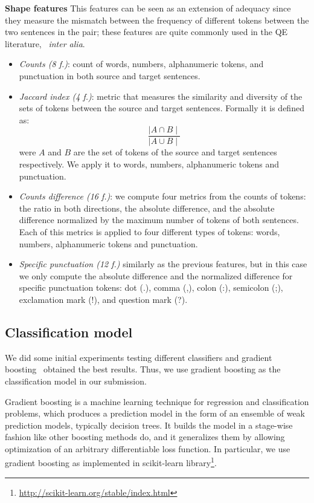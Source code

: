 \textbf{Shape features} This features can be seen as an extension of adequacy since they measure the mismatch between the frequency of different tokens between the two sentences in the pair; these features are quite commonly used in the QE literature,~\cite{specia15} \textit{inter alia}.
\begin{itemize}
\item \textit{Counts (8 f.)}: count of words, numbers, alphanumeric tokens, and punctuation in both source and target sentences.
\item \textit{Jaccard index (4 f.)}: metric that measures the similarity and diversity of the sets of tokens between the source and target sentences. Formally it is defined as:
$$ \frac{\mid A\cap B\mid}{\mid A\cup B\mid}$$
were $A$ and $B$ are the set of tokens of the source and target sentences respectively. We apply it to words, numbers, alphanumeric tokens and punctuation.
\item \textit{Counts difference (16 f.)}: we compute four metrics from the counts of tokens: the ratio in both directions, the absolute difference, and the absolute difference normalized by the maximum number of tokens of both sentences. Each of this metrics is applied to four different types of tokens: words, numbers, alphanumeric tokens and punctuation.
\item \textit{Specific punctuation (12 f.)} similarly as the previous features, but in this case we only compute the absolute difference and the normalized difference for specific punctuation tokens: dot (.), comma (,), colon (:), semicolon (;), exclamation mark (!), and question mark (?).
\end{itemize}



\subsection{Classification model}
\label{ssec:model}

We did some initial experiments testing different classifiers and gradient boosting~\cite{Friedman02} obtained the best results. Thus, we use gradient boosting as the classification model in our submission.

Gradient boosting is a machine learning technique for regression and classification problems, which produces a prediction model in the form of an ensemble of weak prediction models, typically decision trees. It builds the model in a stage-wise fashion like other boosting methods do, and it generalizes them by allowing optimization of an arbitrary differentiable loss function. In particular, we use gradient boosting as implemented in scikit-learn library\footnote{\url{http://scikit-learn.org/stable/index.html}}.


